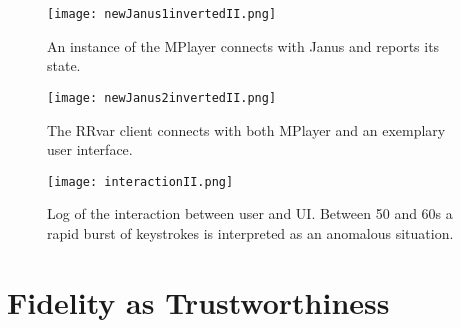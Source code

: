 \documentclass{article}
\begin{document}
\begin{figure}
\centerline{\texttt{[image: newJanus1invertedII.png]}}
\caption{An instance of the MPlayer connects with Janus and reports its state.}
\label{f:newJanus1}
\end{figure}

\begin{figure}
\centerline{\texttt{[image: newJanus2invertedII.png]}}
\caption{The RRvar client connects with both MPlayer and an exemplary user interface.}
\label{f:newJanus2}
\end{figure}

\begin{figure}
\centerline{\texttt{[image: interactionII.png]}}
\caption{Log of the interaction between user and UI. Between 50 and 60s a rapid burst of keystrokes
is interpreted as an anomalous situation.}
\label{f:interaction}
\end{figure}



\section{Fidelity as Trustworthiness}\label{s:trust}
\end{document}
